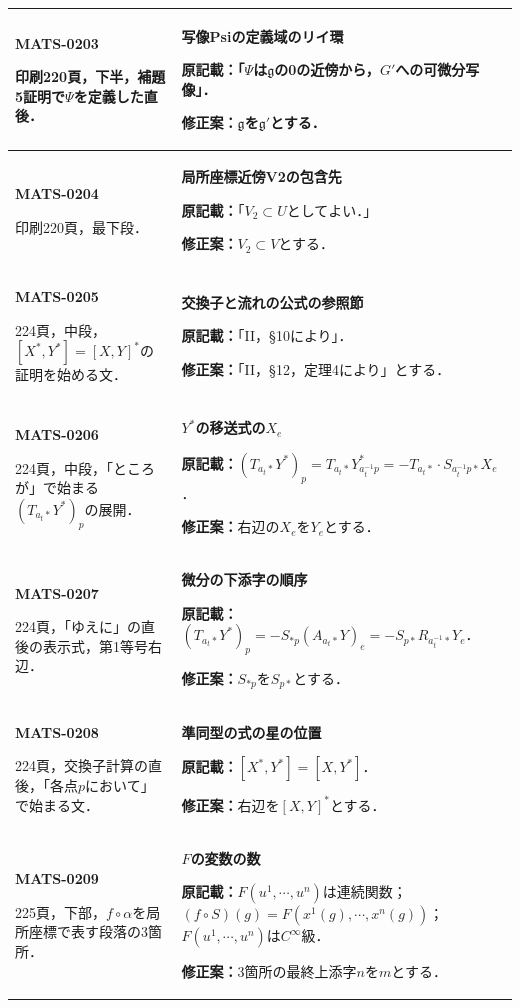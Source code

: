\documentclass[a4paper,10pt]{ltjsarticle}
\begin{document}
\begin{longtable}{@{}>{\raggedright\arraybackslash}p{.19\linewidth}>{\raggedright\arraybackslash}p{.77\linewidth}@{}}
\hline
\hypertarget{MATS-0203}{}\textbf{MATS-0203}\par 印刷220頁，下半，補題5証明で$\Psi$を定義した直後． & \textbf{写像Psiの定義域のリイ環}\par\textbf{原記載：}「$\Psi$は$\mathfrak g$の0の近傍から，$G'$への可微分写像」．\par\textbf{修正案：}$\mathfrak g$を$\mathfrak g'$とする． \\[3pt]
\hline
\hypertarget{MATS-0204}{}\textbf{MATS-0204}\par 印刷220頁，最下段． & \textbf{局所座標近傍V2の包含先}\par\textbf{原記載：}「$V_2\subset U$としてよい．」\par\textbf{修正案：}$V_2\subset V$とする． \\[3pt]
\hline
\hypertarget{MATS-0205}{}\textbf{MATS-0205}\par 224頁，中段，$[X^*,Y^*]=[X,Y]^*$の証明を始める文． & \textbf{交換子と流れの公式の参照節}\par\textbf{原記載：}「II，§10により」．\par\textbf{修正案：}「II，§12，定理4により」とする． \\[3pt]
\hline
\hypertarget{MATS-0206}{}\textbf{MATS-0206}\par 224頁，中段，「ところが」で始まる$(T_{a_t*}Y^*)_p$の展開． & \textbf{$Y^*$の移送式の$X_e$}\par\textbf{原記載：}$(T_{a_t*}Y^*)_p=T_{a_t*}Y^*_{a_t^{-1}p}=-T_{a_t*}\cdot S_{a_t^{-1}p*}X_e$．\par\textbf{修正案：}右辺の$X_e$を$Y_e$とする． \\[3pt]
\hline
\hypertarget{MATS-0207}{}\textbf{MATS-0207}\par 224頁，「ゆえに」の直後の表示式，第1等号右辺． & \textbf{微分の下添字の順序}\par\textbf{原記載：}$(T_{a_t*}Y^*)_p=-S_{*p}(A_{a_t*}Y)_e=-S_{p*}R_{a_t^{-1}*}Y_e$．\par\textbf{修正案：}$S_{*p}$を$S_{p*}$とする． \\[3pt]
\hline
\hypertarget{MATS-0208}{}\textbf{MATS-0208}\par 224頁，交換子計算の直後，「各点$p$において」で始まる文． & \textbf{準同型の式の星の位置}\par\textbf{原記載：}$[X^*,Y^*]=[X,Y^*]$．\par\textbf{修正案：}右辺を$[X,Y]^*$とする． \\[3pt]
\hline
\hypertarget{MATS-0209}{}\textbf{MATS-0209}\par 225頁，下部，$f\circ\alpha$を局所座標で表す段落の3箇所． & \textbf{$F$の変数の数}\par\textbf{原記載：}$F(u^1,\cdots,u^n)$は連続関数；$(f\circ S)(g)=F(x^1(g),\cdots,x^n(g))$；$F(u^1,\cdots,u^n)$は$C^\infty$級．\par\textbf{修正案：}3箇所の最終上添字$n$を$m$とする． \\[3pt]

\end{longtable}
\end{document}
